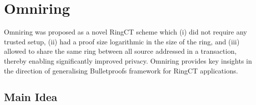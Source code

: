 \section{Omniring}
\label{scn:omniring}

Omniring \cite{Lai2019} was proposed as a novel RingCT scheme which (i) did not require any trusted setup,
(ii) had a proof size logarithmic in the size of the ring, and (iii) allowed to share the same
ring between all source addressed in a transaction, thereby enabling significantly improved privacy.
Omniring provides key insights in the direction of generalising Bulletproofs \cite{Bunz2018} framework for RingCT applications.

\subsection{Main Idea}
\label{subscn:idea_omniring}

